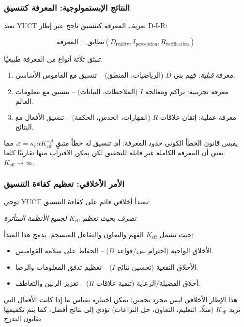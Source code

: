 \documentclass[12pt,a4paper]{article}
\newcommand{\eff}{\mathrm{eff}}
\newcommand{\Ke}{K_{\eff}}
\begin{document}
	\subsubsection{النتائج الإبستمولوجية: المعرفة كتنسيق}
	
	تعيد YUCT تعريف المعرفة كتنسيق ناجح عبر إطار D-I-R:
	
	\[
	\text{المعرفة} = \text{تطابق}(D_{\text{reality}}, I_{\text{perception}}, R_{\text{verification}})
	\]
	
	تنبثق ثلاثة أنواع من المعرفة طبيعيًا:
	\begin{enumerate}
		\item معرفة \textit{قبلية}: فهم بنى $D$ (الرياضيات، المنطق) – تنسيق مع القاموس الأساسي.
		\item معرفة تجريبية: تراكم ومعالجة $I$ (الملاحظات، البيانات) – تنسيق مع معلومات العالم.
		\item معرفة عملية: إتقان علاقات $R$ (المهارات، الحدس، الحكمة) – تنسيق الأفعال مع النتائج.
	\end{enumerate}
	
	يقيس قانون الخطأ الكوني حدود المعرفة: أي تنسيق له خطأ متبقٍ \(\varepsilon = \kappa_c \alpha \Ke^{-\beta}\)، مما يعني أن المعرفة الكاملة غير قابلة للتحقيق لكن يمكن الاقتراب منها تقاربيًا كلما \(\Ke \to \infty\).
	
	\subsubsection{الأمر الأخلاقي: تعظيم كفاءة التنسيق}
	
	توحي YUCT بمبدأ أخلاقي قائم على كفاءة التنسيق:
	
	\begin{center}
		\textit{تصرف بحيث تعظم \(\Ke\) لجميع الأنظمة المتأثرة}
	\end{center}
	
	حيث تشمل \(\Ke\) الفهم والتعاون والتفاعل المنسجم. يدمج هذا المبدأ:
	\begin{itemize}
		\item الأخلاق الواجبة (احترام بنى/قواعد $D$) – الحفاظ على سلامة القواميس.
		\item الأخلاق النفعية (تحسين نتائج $I$) – تعظيم تدفق المعلومات والرضا.
		\item أخلاق الفضيلة/الرعاية (تنمية علاقات $R$) – تعزيز الرنين والتعاطف.
	\end{itemize}
	
	هذا الإطار الأخلاقي ليس مجرد تخمين؛ يمكن اختباره بقياس ما إذا كانت الأفعال التي تزيد \(\Ke\) (مثلًا، التعليم، التعاون، حل النزاعات) تؤدي إلى نتائج أفضل، كما يتم تكميمها بقانون التدرج.
	
\end{document}
